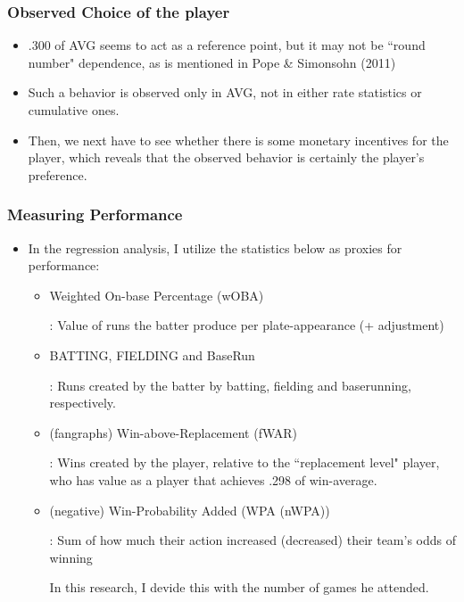 \documentclass[dvipdfmx,12pt]{beamer}
\begin{document}
\begin{frame}\frametitle{Observed Choice of the player}
 \begin{itemize}
   \item .300 of AVG seems to act as a reference point, but it may not be
   ``round number" dependence, as is mentioned in Pope \& Simonsohn (2011)

   \item Such a behavior is observed only in AVG, not in either rate statistics
   or cumulative ones.

   \item Then, we next have to see whether there is some monetary incentives
   for the player, which reveals that the observed behavior is certainly
   the player's preference.

 \end{itemize}
\end{frame}

\begin{frame}\frametitle{Measuring Performance}
  \begin{itemize}
    \item In the regression analysis, I utilize the statistics below as
    proxies for performance:
    \begin{itemize}
      \footnotesize
      \item Weighted On-base Percentage (wOBA)

      : Value of runs the batter produce per plate-appearance (+ adjustment)

      \item BATTING, FIELDING and BaseRun

      : Runs created by the batter by batting, fielding and baserunning,
       respectively.

      \item (fangraphs) Win-above-Replacement (fWAR)

      : Wins created by the player, relative to the ``replacement level" player,
      who has value as a player that achieves .298 of win-average.

      \item (negative) Win-Probability Added (WPA (nWPA))

      : Sum of how much their action increased (decreased)
      their team’s odds of winning

      In this research, I devide this with the number of games he attended.
    \end{itemize}
  \end{itemize}
\end{frame}
\end{document}
